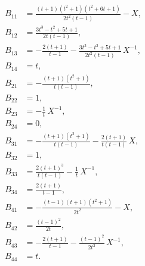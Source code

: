 \begin{align*}
B_{11}&=\frac{\left(t + 1\right) \left(t^{2} + 1\right) \left(t^{2} + 6 t + 1\right)}{2 t^{2} \left(t - 1\right)}-X,\\
B_{12}&=\frac{3 t^{3} - t^{2} + 5 t + 1}{2 t \left(t - 1\right)},\\
B_{13}&=- \frac{2 \left(t + 1\right)}{t - 1}- \frac{3 t^{3} - t^{2} + 5 t + 1}{2 t^{2} \left(t - 1\right)}\,X^{-1},\\
B_{14}&=t,\\
B_{21}&=- \frac{\left(t + 1\right) \left(t^{2} + 1\right)}{t \left(t - 1\right)},\\
B_{22}&=1,\\
B_{23}&=- \frac{1}{t}\,X^{-1},\\
B_{24}&=0,\\
B_{31}&=- \frac{\left(t + 1\right) \left(t^{2} + 1\right)}{t \left(t - 1\right)}- \frac{2 \left(t + 1\right)}{t \left(t - 1\right)}\,X,\\
B_{32}&=1,\\
B_{33}&=\frac{2 \left(t + 1\right)^{3}}{t \left(t - 1\right)}- \frac{1}{t}\,X^{-1},\\
B_{34}&=\frac{2 \left(t + 1\right)}{t - 1},\\
B_{41}&=- \frac{\left(t - 1\right) \left(t + 1\right) \left(t^{2} + 1\right)}{2 t^{2}}-X,\\
B_{42}&=\frac{\left(t - 1\right)^{2}}{2 t},\\
B_{43}&=- \frac{2 \left(t + 1\right)}{t - 1}- \frac{\left(t - 1\right)^{2}}{2 t^{2}}\,X^{-1},\\
B_{44}&=t.
\end{align*}
